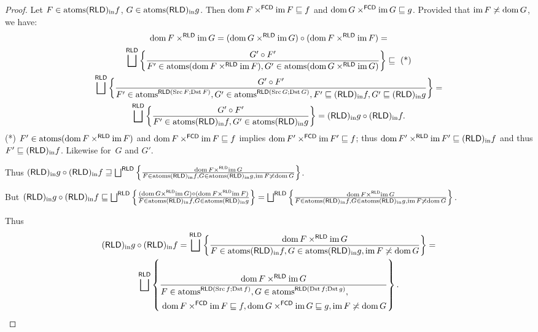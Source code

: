 \begin{proof}
Let $F\in\operatorname{atoms}(\mathsf{RLD})_{\mathrm{in}} f$, $G\in\operatorname{atoms}(\mathsf{RLD})_{\mathrm{in}} g$. Then $\operatorname{dom} F\times^{\mathsf{FCD}}\operatorname{im} F\sqsubseteq f$ and $\operatorname{dom} G\times^{\mathsf{FCD}}\operatorname{im} G\sqsubseteq g$.
Provided that $\operatorname{im} F\not\asymp\operatorname{dom} G$, we have:
\begin{multline*}
\dom F\times^{\mathsf{RLD}}\im G=(\dom G\times^{\mathsf{RLD}}\im G)\circ(\dom F\times^{\mathsf{RLD}}\im F)=\\
\bigsqcup^{\mathsf{RLD}}\setcond{G'\circ F'}{F'\in\atoms(\dom F\times^{\mathsf{RLD}}\im F),G'\in\atoms(\dom G\times^{\mathsf{RLD}}\im G)}\sqsubseteq\text{ (*)}\\
\bigsqcup^{\mathsf{RLD}}\setcond{G'\circ F'}{F'\in\atoms^{\mathsf{RLD}(\Src F;\Dst F)},G'\in\atoms^{\mathsf{RLD}(\Src G;\Dst G)},F'\sqsubseteq\torldin f,G'\sqsubseteq\torldin g}=\\
\bigsqcup^{\mathsf{RLD}}\setcond{G'\circ F'}{F'\in\atoms\torldin f,G'\in\atoms\torldin g}=\torldin g\circ\torldin f.
\end{multline*}
(*) $F'\in\operatorname{atoms}(\operatorname{dom} F\times^{\mathsf{RLD}}\operatorname{im} F)$ and $\operatorname{dom} F\times^{\mathsf{FCD}}\operatorname{im} F\sqsubseteq f$ implies $\operatorname{dom} F'\times^{\mathsf{FCD}}\operatorname{im} F'\sqsubseteq f$;
thus $\operatorname{dom} F'\times^{\mathsf{RLD}}\operatorname{im} F'\sqsubseteq (\mathsf{RLD})_{\mathrm{in}} f$ and thus $F'\sqsubseteq (\mathsf{RLD})_{\mathrm{in}} f$. Likewise for~$G$ and $G'$.

Thus $\torldin g\circ\torldin f\sqsupseteq\bigsqcup^{\mathsf{RLD}}\setcond{\dom F\times^{\mathsf{RLD}}\im G}{F\in\atoms\torldin f,G\in\atoms\torldin g,\im F\nasymp\dom G}$.

But $\torldin g\circ\torldin f\sqsubseteq\bigsqcup^{\mathsf{RLD}}\setcond{(\dom G\times^{\mathsf{RLD}}\im G)\circ(\dom F\times^{\mathsf{RLD}}\im F)}{F\in\atoms\torldin f,G\in\atoms\torldin g}
= \bigsqcup^{\mathsf{RLD}}\setcond{\dom F\times^{\mathsf{RLD}}\im G}{F\in\atoms\torldin f,G\in\atoms\torldin g,\im F\nasymp\dom G}$.

Thus 
\begin{multline*}
\torldin g\circ\torldin f=\bigsqcup^{\mathsf{RLD}}\setcond{\dom F\times^{\mathsf{RLD}}\im G}{F\in\atoms\torldin f,G\in\atoms\torldin g,\im F\nasymp\dom G}=\\
\bigsqcup^{\mathsf{RLD}}\setcond{\dom F\times^{\mathsf{RLD}}\im G}{
\begin{aligned}&F\in\atoms^{\mathsf{RLD}(\Src f;\Dst f)},G\in\atoms^{\mathsf{RLD}(\Dst f;\Dst g)},\\&\dom F\times^{\mathsf{FCD}}\im F\sqsubseteq f,\dom G\times^{\mathsf{FCD}}\im G\sqsubseteq g,\im F\nasymp\dom G\end{aligned}}.
\end{multline*}



\end{proof}
